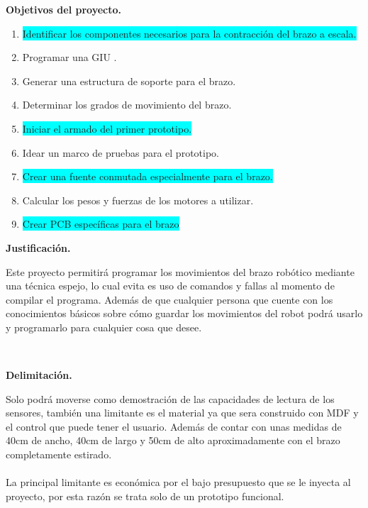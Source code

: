 \documentclass[letterpaper]{article}
\begin{document}
\begin{large}
    \begin{LARGE}
        \textbf{Objetivos del proyecto.}\\
    \end{LARGE}
    \begin{enumerate} 
        \item \colorbox{cyan}{Identificar los componentes necesarios para la contracción del brazo a escala.} 
        \item Programar una GIU .
        \item Generar una estructura de soporte para el brazo.
        \item Determinar los grados de movimiento del brazo.
        \item \colorbox{cyan}{Iniciar el armado del primer prototipo.}
        \item Idear un marco de pruebas para el prototipo.
        \item \colorbox{cyan}{Crear una fuente conmutada especialmente para el brazo.}
        \item Calcular los pesos y fuerzas de los motores a utilizar.
        \item \colorbox{cyan}{Crear PCB específicas para el brazo}
    \end{enumerate}
\end{large}
\vspace{1.5cm}
\begin{large}
    \begin{LARGE}
        \textbf{Justificación.}\\
    \end{LARGE}
Este proyecto permitirá programar los movimientos del brazo robótico mediante una técnica espejo, lo cual evita es uso de comandos y fallas al momento de compilar el programa. Además de que cualquier persona que cuente con los conocimientos básicos sobre cómo guardar los movimientos del robot podrá usarlo y programarlo para cualquier cosa que desee. 
\end{large}
\vspace{1.8cm}\\
\begin{large}
    \begin{LARGE}
        \textbf{Delimitación.}\\
    \end{LARGE}
  Solo podrá moverse como demostración de las capacidades de lectura de los sensores, también una limitante es el material ya que sera construido con MDF y el control que puede tener el usuario. Además de contar con unas medidas de 40cm de ancho, 40cm de largo y 50cm de alto aproximadamente con el brazo completamente estirado.\\\\
  La principal limitante es económica por el bajo presupuesto que se le inyecta al proyecto, por esta razón se trata solo de un prototipo funcional.
\end{large}
\end{document}

